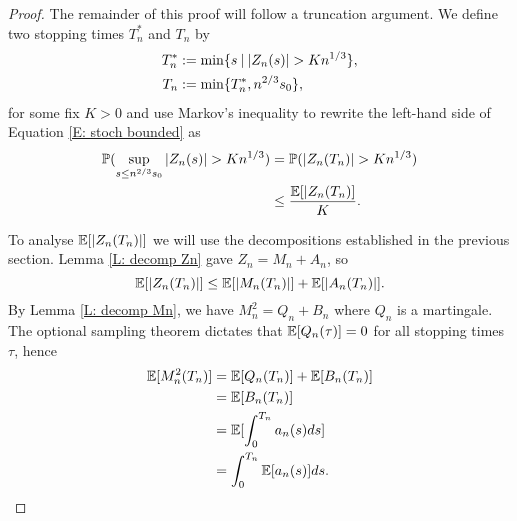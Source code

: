 \begin{proof}
    The remainder of this proof will follow a truncation argument.
    We define two stopping times $T^*_n$ and $T_n$ by
    \begin{align} 
    T^*_n &:= \min \lbrace s \: | \: |Z_n(s)| > K n^{1 / 3} \rbrace, \label{E: def T*n} \\
    T_n &:= \min \lbrace T^*_n, n^{2 / 3}s_0 \rbrace ,  \label{E: def Tn}
    \end{align}
    for some fix $K>0$ and use Markov's inequality to rewrite the left-hand side of Equation \eqref{E: stoch bounded} as
    \begin{equation} \label{E: stoch bounded 2}
    \begin{aligned}
    \mathbb{P}( \sup_{s\leq n^{2/3} s_0} |Z_n(s)| > K n^{1 / 3} ) &= \mathbb{P}( |Z_n(T_n)| > Kn^{1 / 3} ) \\
    &\leq \frac{\mathbb{E}[|Z_n(T_n)]}{K}.
    \end{aligned} 
    \end{equation}
    
    To analyse $\mathbb{E}[|Z_n(T_n)|]$ we will use the decompositions established in the previous section. 
    Lemma \ref{L: decomp Zn} gave $Z_n = M_n + A_n$,
    so \begin{equation} \label{E: Exp(|Zn|)}
    \mathbb{E}[|Z_n(T_n)|] \leq \mathbb{E}[|M_n(T_n)|] + \mathbb{E}[|A_n(T_n)|].
    \end{equation}
    By Lemma \ref{L: decomp Mn}, we have $M^2_n = Q_n + B_n$ where $Q_n$ is a martingale. 
    The optional sampling theorem dictates that 
    $\mathbb{E}[Q_n(\tau)] = 0$ 
    for all stopping times $\tau$, hence 
    \begin{align*}
    \mathbb{E}[M^2_n(T_n)] 
    &= \mathbb{E}[Q_n(T_n)] + \mathbb{E}[B_n(T_n)] \\
    &= \mathbb{E}[B_n(T_n)] \\
    &= \mathbb{E}[ \int_{0}^{T_n} a_n(s)ds ] \\
    &= \int_{0}^{T_n} \mathbb{E}[a_n(s)] ds.
    \end{align*}
    

\end{proof}
